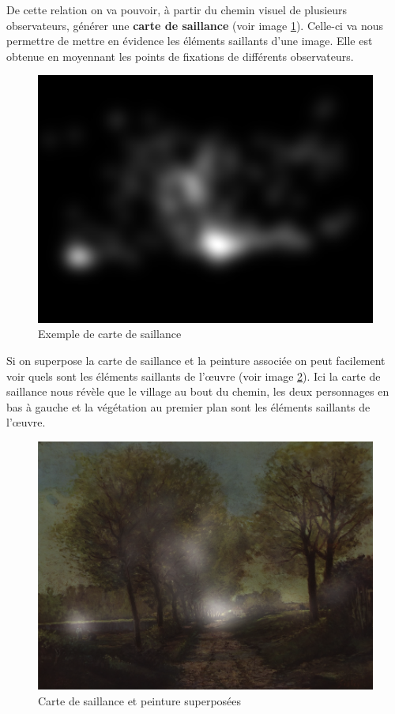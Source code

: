 \par
De cette relation on va pouvoir, à partir du chemin visuel de plusieurs observateurs, générer une \textbf{carte de saillance} (voir image \ref{ex_saliency_map}). Celle-ci va nous permettre de mettre en évidence les éléments saillants d'une image. Elle est obtenue en moyennant les points de fixations de différents observateurs. 

\begin{figure}[!ht]
    \centering
    \includegraphics[width=0.7\linewidth]{datas/exemple_saliency_map.png}
    \caption{Exemple de carte de saillance}
    \label{ex_saliency_map}
\end{figure}

\par
Si on superpose la carte de saillance et la peinture associée on peut facilement voir quels sont les éléments saillants de l'\oe{}uvre (voir image \ref{saliency_map_transparency}). Ici la carte de saillance nous révèle que le village au bout du chemin, les deux personnages en bas à gauche et la végétation au premier plan sont les éléments saillants de l'\oe{}uvre.

\begin{figure}[!ht]
    \centering
    \includegraphics[width=0.7\linewidth]{datas/exemple_saliency_map_transparency.png}
    \caption{Carte de saillance et peinture superposées}
    \label{saliency_map_transparency}
\end{figure}

